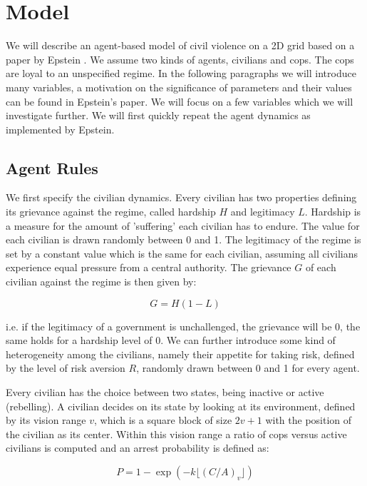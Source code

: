 \documentclass[11pt,a4paper,onecolumn]{article}
\begin{document}
\section{Model}
We will describe an agent-based model of civil violence on a 2D grid based on a paper by Epstein \cite{Epstein}. We assume two kinds of agents, civilians and cops. The cops are loyal to an unspecified regime. In the following paragraphs we will introduce many variables, a motivation on the significance of parameters and their values can be found in Epstein's paper. We will focus on a few variables which we will investigate further. We will first quickly repeat the agent dynamics as implemented by Epstein.

\subsection{Agent Rules}
We first specify the civilian dynamics. Every civilian has two properties defining its grievance against the regime, called hardship $H$ and legitimacy $L$. Hardship is a measure for the amount of 'suffering' each civilian has to endure. The value for each civilian is drawn randomly between 0 and 1. The legitimacy of the regime is set by a constant value which is the same for each civilian, assuming all civilians experience equal pressure from a central authority. The grievance $G$ of each civilian against the regime is then given by:

\begin{equation}
  G = H(1 - L)
\end{equation}

i.e. if the legitimacy of a government is unchallenged, the grievance will be 0, the same holds for a hardship level of 0. We can further introduce some kind of heterogeneity among the civilians, namely their appetite for taking risk, defined by the level of risk aversion $R$, randomly drawn between 0 and 1 for every agent.

Every civilian has the choice between two states, being inactive or active (rebelling). A civilian decides on its state by looking at its environment, defined by its vision range $v$, which is a square block of size $2v + 1$ with the position of the civilian as its center. Within this vision range a ratio of cops versus active civilians is computed and an arrest probability is defined as:

\begin{equation}
  \label{eq:arrestprob}
  P = 1 - \exp( - k \lfloor(C/A)_v\rfloor)
\end{equation}
\end{document}
